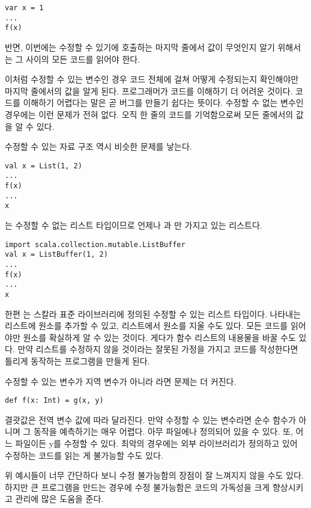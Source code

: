 \begin{verbatim}
var x = 1
...
f(x)
\end{verbatim}

반면, 이번에는  수정할 수 있기에  호출하는 마지막 줄에서  값이 무엇인지
알기 위해서는 그 사이의 모든 코드를 읽어야 한다.

이처럼  수정할 수 있는 변수인 경우  코드 전체에 걸쳐 어떻게 수정되는지
확인해야만 마지막 줄에서의  값을 알게 된다. 프로그래머가 코드를 이해하기 더
어려운 것이다. 코드를 이해하기 어렵다는 말은 곧 버그를 만들기 쉽다는 뜻이다. 
수정할 수 없는 변수인 경우에는 이런 문제가 전혀 없다. 오직 한 줄의 코드를
기억함으로써 모든 줄에서의  값을 알 수 있다.

수정할 수 있는 자료 구조 역시 비슷한 문제를 낳는다.

\begin{verbatim}
val x = List(1, 2)
...
f(x)
...
x
\end{verbatim}

는 수정할 수 없는 리스트 타입이므로  언제나 과 만 가지고 있는 리스트다.

\begin{verbatim}
import scala.collection.mutable.ListBuffer
val x = ListBuffer(1, 2)
...
f(x)
...
x
\end{verbatim}

한편 는 스칼라 표준 라이브러리에 정의된 수정할 수 있는 리스트
타입이다.  나타내는 리스트에 원소를 추가할 수 있고, 리스트에서 원소를 지울
수도 있다. 모든 코드를
읽어야만  원소를 확실하게 알 수 있는 것이다. 게다가 함수  리스트의
내용물을 바꿀 수도 있다. 만약  리스트를 수정하지 않을 것이라는 잘못된 가정을
가지고 코드를 작성한다면 틀리게 동작하는 프로그램을 만들게 된다.

수정할 수 있는 변수가 지역 변수가 아니라 라면 문제는
더 커진다.

\begin{verbatim}
def f(x: Int) = g(x, y)
\end{verbatim}

 결괏값은 전역 변수  값에 따라 달라진다. 만약  수정할 수 있는 변수라면
 순수 함수가 아니며 그 동작을 예측하기는 매우 어렵다.  아무 파일에나
정의되어 있을 수 있다. 또, 어느 파일이든 y를 수정할 수 있다. 최악의 경우에는 외부
라이브러리가  정의하고 있어  수정하는 코드를 읽는 게 불가능할 수도 있다.

위 예시들이 너무 간단하다 보니 수정 불가능함의 장점이 잘 느껴지지 않을 수도
있다. 하지만 큰 프로그램을 만드는 경우에 수정 불가능함은 코드의 가독성을 크게
향상시키고 관리에 많은 도움을 준다.

